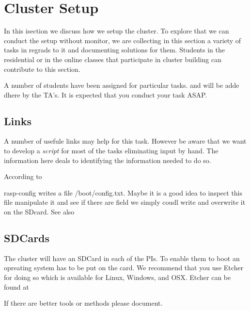 \chapter{Cluster Setup}

In this isection we discuss how we setup the cluster. To explore that
we can conduct the setup without monitor, we are collecting in this
section a variety of tasks in regrads to it and documenting solutions
for them. Students in the residential or in the online classes that
participate in cluster building can contribute to this section.

A number of students have been assigned for particular tasks. and will
be adde dhere by the TA's. It is expected that you conduct your task ASAP.

\section{Links}

A number of usefule links may help for this task. However be aware
that we want to develop a {\em script} for most of the tasks
eliminating input by hand. The information here deals to identifying
the information needed to do so.



According to 


rasp-config writes a file /boot/config.txt. Maybe it is a good idea to
inspect this file manipulate it and see if there are field we simply
coudl write and overwrite it on the SDcard. See also 



\section{SDCards}

The cluster will have an SDCard in each of the PIs. To enable them to
boot an opreating system has to be put on the card. We recommend that
you use Etcher for doing so which is available for Linux, Windows, and
OSX. Etcher can be found at 

If there are better tools or methods please document.

